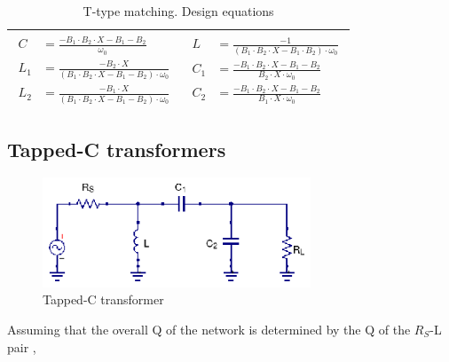 \begin{table}[H]
\begin{tabular}{ | c | c | }
\\ \hline
    \begin{minipage}{.4\textwidth}
         {\begin{align}
           C &= \frac{-B_1 \cdot B_2 \cdot X - B_1 - B_2}{\omega_0}\\
           L_1 &= \frac{-B_2 \cdot X}{(B_1 \cdot B_2 \cdot X - B_1 - B_2) \cdot \omega_0}\\
           L_2 &= \frac{-B_1 \cdot X}{(B_1 \cdot B_2 \cdot X - B_1 - B_2) \cdot \omega_0}
         \end{align}}
    \end{minipage}
    &
        \begin{minipage}{.4\textwidth}
         {\begin{align}
           L &= \frac{-1}{(B_1 \cdot B_2 \cdot X - B_1 \cdot B_2) \cdot \omega_0}\\
           C_1 &= \frac{-B_1 \cdot B_2 \cdot X - B_1 - B_2}{B_2 \cdot X \cdot \omega_0}\\
           C_2 &= \frac{-B_1 \cdot B_2 \cdot X - B_1 - B_2}{B_1 \cdot X \cdot \omega_0}
         \end{align}}
    \end{minipage}
    \\ \hline
  \end{tabular}
  \caption{T-type matching. Design equations}
  \label{tbl:tee-matching}
\end{table}

\subsection{Tapped-C transformers}

\begin{figure}[H]
\centering
\includegraphics[width=80mm]{./images/Synthesis/Impedance_Matching/Tapped-C-Transformer}
\caption{Tapped-C transformer}
\label{fig:tapped-c-transformer}
\end{figure}

\noindent Assuming that the overall Q of the network is determined by the Q of the $R_S$-L pair \cite{TheDesignofCMOSRFIC}, 

